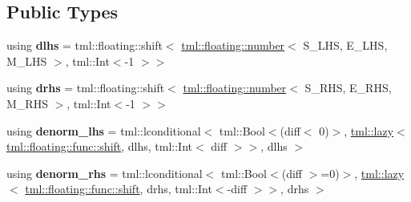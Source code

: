 \subsection*{Public Types}
\begin{DoxyCompactItemize}
\item 
\hypertarget{structtml_1_1add_3_01tml_1_1floating_1_1number_3_01_s___l_h_s_00_01_e___l_h_s_00_01_m___l_h_s_01f5ea122b4a29987e9df4655966e7e279_a6ef805f3db7190cc8f4db93b6b656f97}{using {\bfseries dlhs} = tml\+::floating\+::shift$<$ \hyperlink{structtml_1_1floating_1_1number}{tml\+::floating\+::number}$<$ S\+\_\+\+L\+H\+S, E\+\_\+\+L\+H\+S, M\+\_\+\+L\+H\+S $>$, tml\+::\+Int$<$-\/1 $>$$>$}\label{structtml_1_1add_3_01tml_1_1floating_1_1number_3_01_s___l_h_s_00_01_e___l_h_s_00_01_m___l_h_s_01f5ea122b4a29987e9df4655966e7e279_a6ef805f3db7190cc8f4db93b6b656f97}

\item 
\hypertarget{structtml_1_1add_3_01tml_1_1floating_1_1number_3_01_s___l_h_s_00_01_e___l_h_s_00_01_m___l_h_s_01f5ea122b4a29987e9df4655966e7e279_a4da0ab59b2d9b49aec796a076f29733b}{using {\bfseries drhs} = tml\+::floating\+::shift$<$ \hyperlink{structtml_1_1floating_1_1number}{tml\+::floating\+::number}$<$ S\+\_\+\+R\+H\+S, E\+\_\+\+R\+H\+S, M\+\_\+\+R\+H\+S $>$, tml\+::\+Int$<$-\/1 $>$$>$}\label{structtml_1_1add_3_01tml_1_1floating_1_1number_3_01_s___l_h_s_00_01_e___l_h_s_00_01_m___l_h_s_01f5ea122b4a29987e9df4655966e7e279_a4da0ab59b2d9b49aec796a076f29733b}

\item 
\hypertarget{structtml_1_1add_3_01tml_1_1floating_1_1number_3_01_s___l_h_s_00_01_e___l_h_s_00_01_m___l_h_s_01f5ea122b4a29987e9df4655966e7e279_af7919ae449608836364cb45053071488}{using {\bfseries denorm\+\_\+lhs} = tml\+::lconditional$<$ tml\+::\+Bool$<$(diff$<$ 0)$>$, \hyperlink{structtml_1_1lazy}{tml\+::lazy}$<$ \hyperlink{structtml_1_1floating_1_1impl_1_1shift}{tml\+::floating\+::func\+::shift}, dlhs, tml\+::\+Int$<$ diff $>$$>$, dlhs $>$}\label{structtml_1_1add_3_01tml_1_1floating_1_1number_3_01_s___l_h_s_00_01_e___l_h_s_00_01_m___l_h_s_01f5ea122b4a29987e9df4655966e7e279_af7919ae449608836364cb45053071488}

\item 
\hypertarget{structtml_1_1add_3_01tml_1_1floating_1_1number_3_01_s___l_h_s_00_01_e___l_h_s_00_01_m___l_h_s_01f5ea122b4a29987e9df4655966e7e279_a432f0efd40081f16e7dbf3689a96a458}{using {\bfseries denorm\+\_\+rhs} = tml\+::lconditional$<$ tml\+::\+Bool$<$(diff $>$=0)$>$, \hyperlink{structtml_1_1lazy}{tml\+::lazy}$<$ \hyperlink{structtml_1_1floating_1_1impl_1_1shift}{tml\+::floating\+::func\+::shift}, drhs, tml\+::\+Int$<$-\/diff $>$$>$, drhs $>$}\label{structtml_1_1add_3_01tml_1_1floating_1_1number_3_01_s___l_h_s_00_01_e___l_h_s_00_01_m___l_h_s_01f5ea122b4a29987e9df4655966e7e279_a432f0efd40081f16e7dbf3689a96a458}


\end{DoxyCompactItemize}
